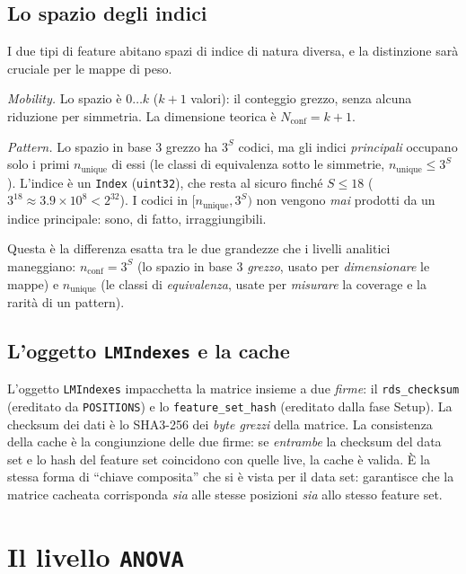 \subsection{Lo spazio degli indici}

I due tipi di feature abitano spazi di indice di natura diversa, e la
distinzione sarà cruciale per le mappe di peso.

\emph{Mobility.} Lo spazio è $0 \ldots k$ ($k+1$ valori): il conteggio grezzo,
senza alcuna riduzione per simmetria. La dimensione teorica è
$N_{\text{conf}} = k + 1$.

\emph{Pattern.} Lo spazio in base 3 grezzo ha $3^{S}$ codici, ma gli indici
\emph{principali} occupano solo i primi $n_{\text{unique}}$ di essi (le classi
di equivalenza sotto le simmetrie, $n_{\text{unique}} \le 3^{S}$). L'indice è
un \texttt{Index} (\texttt{uint32}), che resta al sicuro finché $S \le 18$
($3^{18} \approx 3.9 \times 10^{8} < 2^{32}$). I codici in
$[n_{\text{unique}}, 3^{S})$ non vengono \emph{mai} prodotti da un indice
principale: sono, di fatto, irraggiungibili.

Questa è la differenza esatta tra le due grandezze che i livelli analitici
maneggiano: $n_{\text{conf}} = 3^{S}$ (lo spazio in base 3 \emph{grezzo},
usato per \emph{dimensionare} le mappe) e $n_{\text{unique}}$ (le classi di
\emph{equivalenza}, usate per \emph{misurare} la coverage e la rarità di un
pattern).

\subsection{L'oggetto \texttt{LMIndexes} e la cache}

L'oggetto \texttt{LMIndexes} impacchetta la matrice insieme a due \emph{firme}:
il \texttt{rds\_checksum} (ereditato da \texttt{POSITIONS}) e lo
\texttt{feature\_set\_hash} (ereditato dalla fase Setup). La checksum dei dati
è lo SHA3-256 dei \emph{byte grezzi} della matrice. La consistenza della cache
è la congiunzione delle due firme: se \emph{entrambe} la checksum del data set
e lo hash del feature set coincidono con quelle live, la cache è valida. È la
stessa forma di ``chiave composita'' che si è vista per il data set:
garantisce che la matrice cacheata corrisponda \emph{sia} alle stesse
posizioni \emph{sia} allo stesso feature set.

\section{Il livello \texttt{ANOVA}}
\label{sec:corpus-anova}

